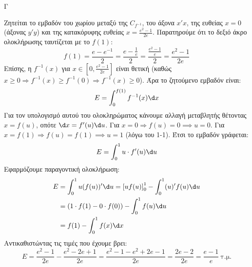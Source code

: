 \begin{thema}{Γ}
\begin{erwthma}
Ζητείται το εμβαδόν του χωρίου μεταξύ της $C_{f^{-1}}$, του άξονα $x'x$, της ευθείας $x=0$ (άξονας $y'y$) και της κατακόρυφης ευθείας $x = \frac{e^2-1}{2e}$.
Παρατηρούμε ότι το δεξιό άκρο ολοκλήρωσης ταυτίζεται με το $f(1)$:
\[ f(1) = \frac{e - e^{-1}}{2} = \frac{e - \frac{1}{e}}{2} = \frac{\frac{e^2-1}{e}}{2} = \frac{e^2-1}{2e} \]
Επίσης, η $f^{-1}(x)$ για $x \in \left[0, \frac{e^2-1}{2e}\right]$ είναι θετική (καθώς $x \ge 0 \Rightarrow f^{-1}(x) \ge f^{-1}(0) \Rightarrow f^{-1}(x) \ge 0$).
Άρα το ζητούμενο εμβαδόν είναι:
\[ E = \int_0^{f(1)} f^{-1}(x) \d x \]
Για τον υπολογισμό αυτού του ολοκληρώματος κάνουμε αλλαγή μεταβλητής θέτοντας $x = f(u)$, οπότε $\d x = f'(u) \d u$.
Για $x = 0 \Rightarrow f(u) = 0 \implies u = 0$.
Για $x = f(1) \Rightarrow f(u) = f(1) \implies u = 1$ (λόγω του 1-1).
Έτσι το εμβαδόν γράφεται:
\[ E = \int_0^1 u \cdot f'(u) \d u \]
Εφαρμόζουμε παραγοντική ολοκλήρωση:
\begin{align*}
E &= \int_0^1 u (f(u))' \d u = \left[ u f(u) \right]_0^1 - \int_0^1 (u)' f(u) \d u \\
&= (1 \cdot f(1) - 0 \cdot f(0)) - \int_0^1 f(u) \d u \\
&= f(1) - \int_0^1 f(x) \d x
\end{align*}
Αντικαθιστώντας τις τιμές που έχουμε βρει:
\[ E = \frac{e^2-1}{2e} - \frac{e^2 - 2e + 1}{2e} = \frac{e^2 - 1 - e^2 + 2e - 1}{2e} = \frac{2e - 2}{2e} = \frac{e-1}{e} \ \text{τ.μ.} \]
\end{erwthma}
\end{thema}

